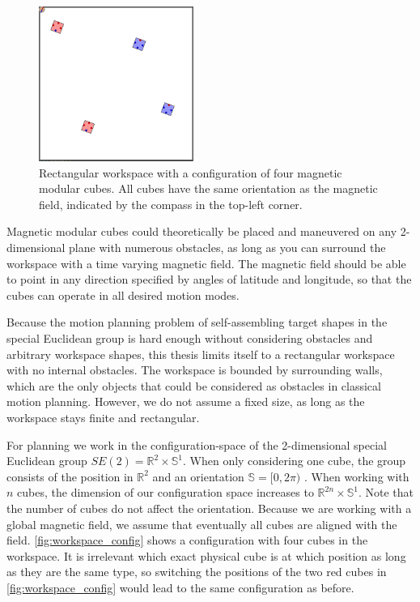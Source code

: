 \begin{figure}
	\centering
	\includegraphics[width=0.45\textwidth]{figures/workspace_config.png}
	\caption[Workspace configuration of four magnetic modular cubes]{Rectangular workspace with a configuration of four magnetic modular cubes. All cubes have the same orientation as the magnetic field, indicated by the compass in the top-left corner.}
	\label{fig:workspace_config}
\end{figure}

Magnetic modular cubes could theoretically be placed and maneuvered on any 2-dimensional plane with numerous obstacles, as long as you can surround the workspace with a time varying magnetic field.
The magnetic field should be able to point in any direction specified by angles of latitude and longitude, so that the cubes can operate in all desired motion modes.

Because the motion planning problem of self-assembling target shapes in the special Euclidean group is hard enough without considering obstacles and arbitrary workspace shapes, this thesis limits itself to a rectangular workspace with no internal obstacles.
The workspace is bounded by surrounding walls, which are the only objects that could be considered as obstacles in classical motion planning.
However, we do not assume a fixed size, as long as the workspace stays finite and rectangular.

For planning we work in the configuration-space of the 2-dimensional special Euclidean group $\textit{SE}(2) = \mathbb{R}^2 \times \mathbb{S}^1$.
When only considering one cube, the group consists of the position in $\mathbb{R}^2$ and an orientation $\mathbb{S} = [0,2\pi)$ \cite{LaValle2006}.
When working with $n$ cubes, the dimension of our configuration space increases to $\mathbb{R}^{2n} \times \mathbb{S}^1$.
Note that the number of cubes do not affect the orientation.
Because we are working with a global magnetic field, we assume that eventually all cubes are aligned with the field.
\autoref{fig:workspace_config} shows a configuration with four cubes in the workspace.
It is irrelevant which exact physical cube is at which position as long as they are the same type, so switching the positions of the two red cubes in \autoref{fig:workspace_config} would lead to the same configuration as before.

